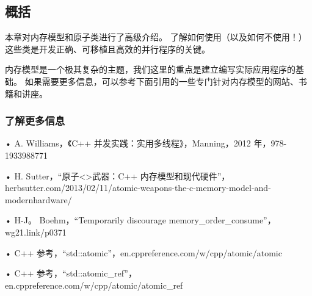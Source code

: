 \subsection{概括}
本章对内存模型和原子类进行了高级介绍。 
了解如何使用（以及如何不使用！）这些类是开发正确、可移植且高效的并行程序的关键。

内存模型是一个极其复杂的主题，我们这里的重点是建立编写实际应用程序的基础。 
如果需要更多信息，可以参考下面引用的一些专门针对内存模型的网站、书籍和讲座。

\subsubsection{了解更多信息}
• A. Williams，《C++ 并发实践：实用多线程》，Manning，2012 年，978-1933988771

• H. Sutter，“原子<>武器：C++ 内存模型和现代硬件”，herbsutter.com/2013/02/11/atomic-weapons-the-c-memory-model-and-modernhardware/

• H-J。 Boehm，“Temporarily discourage memory\_order\_consume”，wg21.link/p0371

• C++ 参考，“std::atomic”，en.cppreference.com/w/cpp/atomic/atomic

• C++ 参考，“std::atomic\_ref”，en.cppreference.com/w/cpp/atomic/atomic\_ref